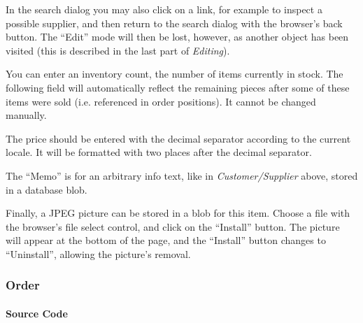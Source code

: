 In the search dialog you may also click on a link, for example to
inspect a possible supplier, and then return to the search dialog with
the browser's back button. The ``Edit'' mode will then be lost, however,
as another object has been visited (this is described in the last part
of \emph{Editing}).

You can enter an inventory count, the number of items currently in
stock. The following field will automatically reflect the remaining
pieces after some of these items were sold (i.e. referenced in order
positions). It cannot be changed manually.

The price should be entered with the decimal separator according to the
current locale. It will be formatted with two places after the decimal
separator.

The ``Memo'' is for an arbitrary info text, like in
\emph{Customer/Supplier} above, stored in a database blob.

Finally, a JPEG picture can be stored in a blob for this item. Choose a
file with the browser's file select control, and click on the ``Install''
button. The picture will appear at the bottom of the page, and the
``Install'' button changes to ``Uninstall'', allowing the picture's removal.

\subsubsection{ Order}
\label{sec:appl-devel-order}%

\paragraph{Source Code}
\label{sec:appl-devel-order-source-code}


